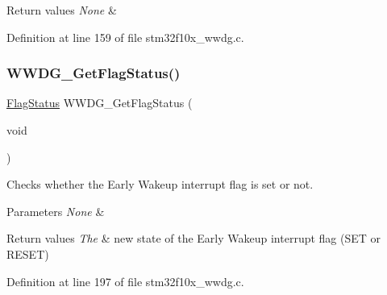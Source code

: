 \begin{DoxyRetVals}{Return values}
{\em None} & \\
\hline
\end{DoxyRetVals}


Definition at line 159 of file stm32f10x\+\_\+wwdg.\+c.

\mbox{\label{group___w_w_d_g___private___functions_ga7df4882d45918b9b8249dfca1e44fabc}} 
\subsubsection{\texorpdfstring{W\+W\+D\+G\+\_\+\+Get\+Flag\+Status()}{WWDG\_GetFlagStatus()}}
{\footnotesize\ttfamily \hyperlink{group___exported__types_ga89136caac2e14c55151f527ac02daaff}{Flag\+Status} W\+W\+D\+G\+\_\+\+Get\+Flag\+Status (\begin{DoxyParamCaption}\item[{void}]{ }\end{DoxyParamCaption})}



Checks whether the Early Wakeup interrupt flag is set or not. 


\begin{DoxyParams}{Parameters}
{\em None} & \\
\hline
\end{DoxyParams}

\begin{DoxyRetVals}{Return values}
{\em The} & new state of the Early Wakeup interrupt flag (S\+ET or R\+E\+S\+ET) \\
\hline
\end{DoxyRetVals}


Definition at line 197 of file stm32f10x\+\_\+wwdg.\+c.

\mbox{\label{group___w_w_d_g___private___functions_ga6e44cc35f133b28b9ad861f459bf8d76}} 
